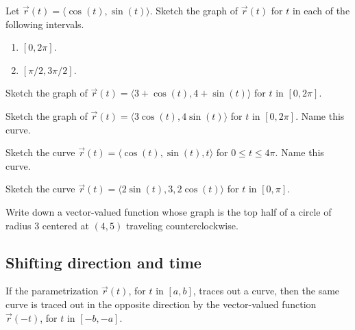 \begin{ex}
    Let $\vec{r}(t)=\langle \cos(t),\sin(t)\rangle$. Sketch the graph of $\vec{r}(t)$ for $t$ in each of the following intervals.
    \begin{multicols}{2}
    \begin{enumerate}
        \item $[0,2\pi]$.
        \item $[\pi/2,3\pi/2]$.
    \end{enumerate}
    \end{multicols}
\end{ex}

\vfill

\pagebreak 

\begin{ex}
    Sketch the graph of $\vec{r}(t)=\langle 3+\cos(t),4+\sin(t)\rangle$ for $t$ in $[0,2\pi]$.
\end{ex}

\vfill

\begin{ex}
    Sketch the graph of $\vec{r}(t)=\langle 3\cos(t),4\sin(t)\rangle$ for $t$ in $[0,2\pi]$. Name this curve.
\end{ex}

\vfill

\begin{ex}
    Sketch the curve $\vec{r}(t)=\langle \cos(t),\sin(t),t\rangle$ for $0\le t\le 4\pi$. Name this curve.
\end{ex}

\vfill

\pagebreak 

\begin{ex}
    Sketch the curve $\vec{r}(t)=\langle 2\sin(t),3,2\cos(t)\rangle$ for $t$ in $[0,\pi]$.
\end{ex}

\vfill

\begin{ex}
    Write down a vector-valued function whose graph is the top half of a circle of radius 3 centered at $(4,5)$ traveling counterclockwise.
\end{ex}

\vfill 

\subsection{Shifting direction and time}
\begin{prop}
    If the parametrization $\vec{r}(t)$, for $t$ in $[a,b]$, traces out a curve, then the same curve is traced out in the opposite direction by the vector-valued function $\vec{r}(-t)$, for $t$ in $[-b,-a]$.
\end{prop}


